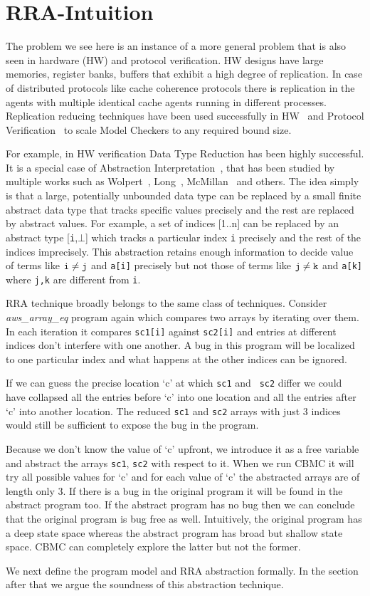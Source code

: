 \section{RRA-Intuition}

The problem we see here is an instance of a more general problem that
is also seen in hardware (HW) and protocol verification. HW designs have large
memories, register banks, buffers that exhibit a high degree of
replication. In case of distributed protocols like cache coherence
protocols there is replication in the agents with multiple identical
cache agents running in different processes.  Replication reducing
techniques have been used successfully in HW~\cite{mcmillan} and
Protocol Verification~\cite{self} to scale Model Checkers to any
required bound size.

For example, in HW verification Data Type Reduction has been highly
successful. It is a special case of Abstraction Interpretation~\cite{abstint},
that has been studied by multiple works such as
Wolpert~\cite{wolpert}, Long~\cite{long}, McMillan~\cite{mcmillan} and
others. The idea simply is that a large, potentially unbounded data
type can be replaced by a small finite abstract data type that tracks
specific values precisely and the rest are replaced by abstract
values. For example, a set of indices [1..n] can be replaced by an
abstract type [{\tt i},\(\bot\)] which tracks a particular index {\tt i} precisely and
the rest of the indices imprecisely. This abstraction retains enough
information to decide value of terms like \({\tt i} \neq {\tt j}\) and {\tt a[i]} precisely but
not those of terms like \({\tt j} \neq {\tt k}\) and {\tt a[k]} where {\tt j,k} are different from {\tt i}.

RRA technique broadly belongs to the same class of
techniques. Consider \emph{aws\_array\_eq} program again which compares two
arrays by iterating over them. In each iteration it compares {\tt sc1[i]}
against {\tt sc2[i]} and entries at different indices don’t interfere with
one another. A bug in this program will be localized to one particular
index and what happens at the other indices can be ignored.

If we can guess the precise location ‘c’ at which {\tt sc1} and {\tt
  sc2} differ we could have collapsed all the entries before ‘c’ into
one location and all the entries after ‘c’ into another location. The
reduced {\tt sc1} and {\tt sc2} arrays with just 3 indices would still
be sufficient to expose the bug in the program.

Because we don’t know the value of ‘c’ upfront, we introduce it as a
free variable and abstract the arrays {\tt sc1}, {\tt sc2} with respect to
it. When we run CBMC it will try all possible values for ‘c’ and for
each value of ‘c’ the abstracted arrays are of length only 3. If there
is a bug in the original program it will be found in the abstract
program too. If the abstract program has no bug then we can conclude
that the original program is bug free as well. Intuitively, the
original program has a deep state space whereas the abstract program
has broad but shallow state space. CBMC can completely explore the
latter but not the former.

We next define the program model and RRA abstraction formally. In the
section after that we argue the soundness of this abstraction
technique.

